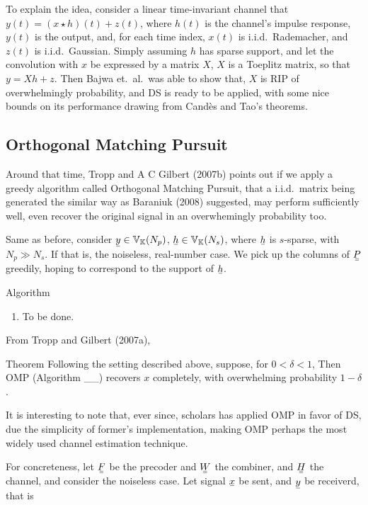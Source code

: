 To explain the idea, consider a linear time-invariant channel that \(y(t) =(x \star h)(t) + z(t)\), where \(h(t)\) is the channel's impulse response, \(y(t)\) is the output, and, for each time index, \(x(t)\) is i.i.d.\ Rademacher, and \(z(t)\) is i.i.d.\ Gaussian.
Simply assuming \(h\) has sparse support, and let the convolution with \(x\) be expressed by a matrix \(X\), \(X\) is a Toeplitz matrix, so that \(y =X h +z\).
Then Bajwa et.\ al.\ was able to show that, \(X\) is RIP of overwhelmingly probability, and DS is ready to be applied, with some nice bounds on its performance drawing from Cand\`es and Tao's theorems.

\subsection{Orthogonal Matching Pursuit}

Around that time, Tropp and A C Gilbert (2007b) points out if we apply a greedy algorithm called Orthogonal Matching Pursuit, that a i.i.d.\ matrix being generated the similar way as Baraniuk (2008) suggested, may perform sufficiently well, even recover the original signal in an overwhemingly probability too.

Same as before, consider \(\V{y} \in \MB{V}_\MB{K} (N_p)\), \(\V{h} \in \MB{V}_\MB{K} (N_s)\), where \(\V{h}\) is \(s\)-sparse, with \(N_p \gg N_s\).
If
that is, the noiseless, real-number case.
We pick up the columns of \(\M{P}\) greedily, hoping to correspond to the support of \(\V{h}\).

\Result
{Algorithm}
{
\begin{enumerate}
\item To be done.
\end{enumerate}
}

From Tropp and Gilbert (2007a),

\Result
{Theorem}
{
Following the setting described above, suppose, for \(0 <\delta <1\),
%
%
Then OMP (Algorithm \_\_) recovers \(x\) completely, with overwhelming probability \(1-\delta\).
}

It is interesting to note that, ever since, scholars has applied OMP in favor of DS, due the simplicity of former's implementation, making OMP perhaps the most widely used channel estimation technique.

For concreteness, let \(\M{F}\) be the precoder and \(\M{W}\) the combiner, and \(\M{H}\) the channel, and consider the noiseless case.
Let signal \(\V{x}\) be sent, and \(\V{y}\) be receiverd, that is
%
%

